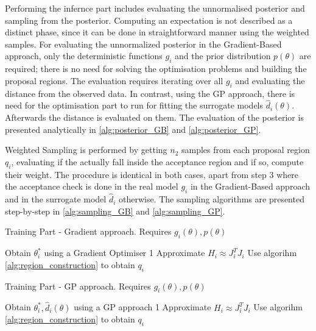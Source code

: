 \documentclass[11pt,twoside]{article}
\numberwithin{Theorem}{section}
\numberwithin{Definition}{section}
\numberwithin{Lemma}{section}
\numberwithin{Algorithm}{section}
\numberwithin{equation}{section}
\begin{document}
Performing the infernce part includes evaluating the unnormalised posterior and sampling from the posterior. Computing an expectation is not described as a distinct phase, since it can be done in straightforward manner using the weighted samples. For evaluating the unnormalized posterior in the Gradient-Based approach, only the deterministic functions $g_i$ and the prior distribution $p(\theta)$ are required; there is no need for solving the optimisation problems and building the proposal regions. The evaluation requires iterating over all $g_i$ and evaluating the distance from the observed data. In contrast, using the GP approach, there is need for the optimisation part to run for fitting the surrogate models $\hat{d}_i(\theta)$. Afterwards the distance is evaluated on them. The evaluation of the posterior is presented analytically in \ref{alg:posterior_GB} and \ref{alg:posterior_GP}.

Weighted Sampling is performed by getting $n_2$ samples from each proposal region $q_i$, evaluating if the actually fall inside the acceptance region and if so, compute their weight. The procedure is identical in both cases, apart from step 3 where the acceptance check is done in the real model $g_i$ in the Gradient-Based approach and in the surrogate model $\hat{d}_i$ otherwise. The sampling algorithms are presented step-by-step in \ref{alg:sampling_GB} and \ref{alg:sampling_GP}.

\begin{minipage}{0.46\textwidth}
\begin{algorithm}[H]
    \centering
    \caption{Training Part - Gradient approach. Requires $g_i(\theta), p(\theta)$}\label{alg:training_GB}
    \begin{algorithmic}[1]
        \State Obtain $\theta_i^*$ using a Gradient Optimiser
         1
        \Else
        \State Approximate $H_i \approx J^T_iJ_i$
        \State Use algorihm \ref{alg:region_construction} to obtain $q_i$
        \EndIf      
      \EndFor
    \end{algorithmic}
\end{algorithm}
\end{minipage}
\hfill
\begin{minipage}{0.46\textwidth}
\begin{algorithm}[H]
    \centering
    \caption{Training Part - GP approach. Requires $g_i(\theta), p(\theta)$}\label{alg:training_GP}
    \begin{algorithmic}[1]
        \State Obtain $\theta_i^*, \hat{d}_i(\theta)$ using a GP approach
         1
        \Else
        \State Approximate $H_i \approx J^T_iJ_i$
        \State Use algorihm \ref{alg:region_construction} to obtain $q_i$
        \EndIf      
      \EndFor
    \end{algorithmic}
\end{algorithm}
\end{minipage}
\end{document}
